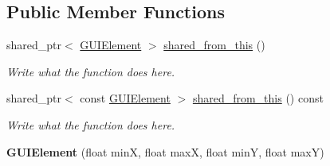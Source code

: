 \subsection*{Public Member Functions}
\begin{DoxyCompactItemize}
\item 
shared\+\_\+ptr$<$ \hyperlink{classGUIElement}{G\+U\+I\+Element} $>$ \hyperlink{classGUIElement_a5ad5998c5b953b6c6e32b583ddf9cd97}{shared\+\_\+from\+\_\+this} ()
\begin{DoxyCompactList}\small\item\em Write what the function does here. \end{DoxyCompactList}\item 
shared\+\_\+ptr$<$ const \hyperlink{classGUIElement}{G\+U\+I\+Element} $>$ \hyperlink{classGUIElement_a5b381516fddb549d5db4c7bf8e6f07b0}{shared\+\_\+from\+\_\+this} () const 
\begin{DoxyCompactList}\small\item\em Write what the function does here. \end{DoxyCompactList}\item 
\hypertarget{classGUIElement_aa57dfc31bd3790306daadf9b60ffd5c9}{{\bfseries G\+U\+I\+Element} (float min\+X, float max\+X, float min\+Y, float max\+Y)}\label{classGUIElement_aa57dfc31bd3790306daadf9b60ffd5c9}


\end{DoxyCompactItemize}
